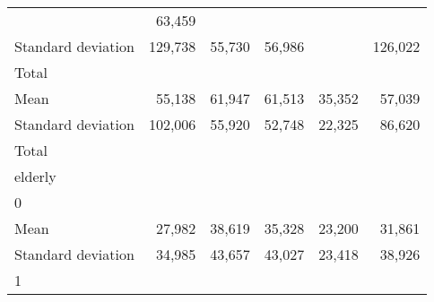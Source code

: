 \begin{tabular}{llllll}
  \multicolumn{1}{r}{} &
  \multicolumn{1}{r}{63,459} \\
\multicolumn{1}{l}{\hspace{4em}Standard deviation} &
  \multicolumn{1}{|r}{129,738} &
  \multicolumn{1}{r}{55,730} &
  \multicolumn{1}{r}{56,986} &
  \multicolumn{1}{r}{} &
  \multicolumn{1}{r}{126,022} \\
\multicolumn{1}{l}{\hspace{3em}Total} &
  \multicolumn{1}{|r}{} &
  \multicolumn{1}{r}{} &
  \multicolumn{1}{r}{} &
  \multicolumn{1}{r}{} &
  \multicolumn{1}{r}{} \\
\multicolumn{1}{l}{\hspace{4em}Mean} &
  \multicolumn{1}{|r}{55,138} &
  \multicolumn{1}{r}{61,947} &
  \multicolumn{1}{r}{61,513} &
  \multicolumn{1}{r}{35,352} &
  \multicolumn{1}{r}{57,039} \\
\multicolumn{1}{l}{\hspace{4em}Standard deviation} &
  \multicolumn{1}{|r}{102,006} &
  \multicolumn{1}{r}{55,920} &
  \multicolumn{1}{r}{52,748} &
  \multicolumn{1}{r}{22,325} &
  \multicolumn{1}{r}{86,620} \\
\multicolumn{1}{l}{\hspace{1em}Total} &
  \multicolumn{1}{|r}{} &
  \multicolumn{1}{r}{} &
  \multicolumn{1}{r}{} &
  \multicolumn{1}{r}{} &
  \multicolumn{1}{r}{} \\
\multicolumn{1}{l}{\hspace{2em}elderly} &
  \multicolumn{1}{|r}{} &
  \multicolumn{1}{r}{} &
  \multicolumn{1}{r}{} &
  \multicolumn{1}{r}{} &
  \multicolumn{1}{r}{} \\
\multicolumn{1}{l}{\hspace{3em}0} &
  \multicolumn{1}{|r}{} &
  \multicolumn{1}{r}{} &
  \multicolumn{1}{r}{} &
  \multicolumn{1}{r}{} &
  \multicolumn{1}{r}{} \\
\multicolumn{1}{l}{\hspace{4em}Mean} &
  \multicolumn{1}{|r}{27,982} &
  \multicolumn{1}{r}{38,619} &
  \multicolumn{1}{r}{35,328} &
  \multicolumn{1}{r}{23,200} &
  \multicolumn{1}{r}{31,861} \\
\multicolumn{1}{l}{\hspace{4em}Standard deviation} &
  \multicolumn{1}{|r}{34,985} &
  \multicolumn{1}{r}{43,657} &
  \multicolumn{1}{r}{43,027} &
  \multicolumn{1}{r}{23,418} &
  \multicolumn{1}{r}{38,926} \\
\multicolumn{1}{l}{\hspace{3em}1} &
  \multicolumn{1}{|r}{} &

\end{tabular}
